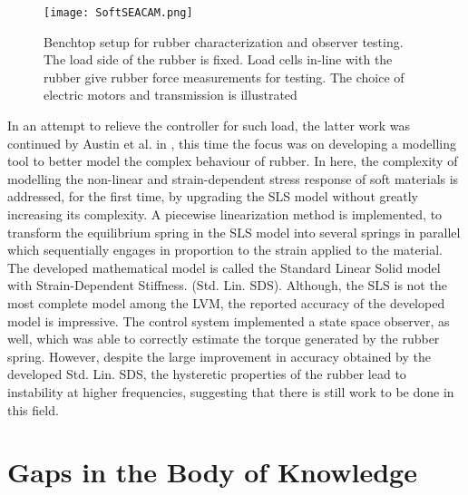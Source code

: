 \begin{figure}[htb!]
	\centering
	\texttt{[image: SoftSEACAM.png]}
	\caption{Benchtop setup for rubber characterization and observer testing. The load side of the rubber is fixed. Load cells in-line with the rubber give rubber force measurements for testing. The choice of electric motors and transmission is illustrated \cite{schepelmann2014compact}}
	\label{fig:softSEACAM}
\end{figure}

In an attempt to relieve the controller for such load, the latter work was continued by Austin et al. in \cite{austin2015control}, this time the focus was on developing a modelling tool to better model the complex behaviour of rubber. In here, the complexity of modelling the non-linear and strain-dependent stress response of soft materials is addressed, for the first time, by upgrading the SLS model without greatly increasing its complexity. A piecewise linearization method is implemented, to transform the equilibrium spring in the SLS model into several springs in parallel which sequentially engages in proportion to the strain applied to the material. The developed mathematical model is called the Standard Linear Solid model with Strain-Dependent Stiffness. (Std. Lin. SDS). Although, the SLS is not the most complete model among the LVM, the reported accuracy of the developed model is impressive. The control system implemented a state space observer, as well, which was able to correctly estimate the torque generated by the rubber spring. However, despite the large improvement in accuracy obtained by the developed Std. Lin. SDS, the hysteretic properties of the rubber  lead to instability at higher frequencies, suggesting that there is still work to be done in this field.

\section{Gaps in the Body of Knowledge} \label{sec:gaps}

